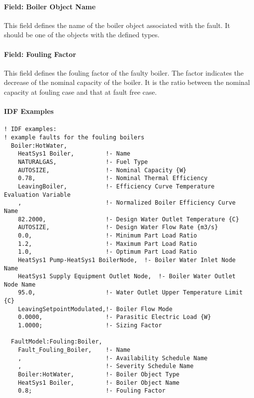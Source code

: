 \paragraph{Field: Boiler Object Name}\label{field-boiler-object-name}

This field defines the name of the boiler object associated with the fault. It should be one of the objects with the defined types.

\paragraph{Field: Fouling Factor}\label{field-fouling-factor}

This field defines the fouling factor of the faulty boiler. The factor indicates the decrease of the nominal capacity of the boiler. It is the ratio between the nominal capacity at fouling case and that at fault free case.

\paragraph{IDF Examples}

\begin{lstlisting}
! IDF examples:
! example faults for the fouling boilers
  Boiler:HotWater,
    HeatSys1 Boiler,         !- Name
    NATURALGAS,              !- Fuel Type
    AUTOSIZE,                !- Nominal Capacity {W}
    0.78,                    !- Nominal Thermal Efficiency
    LeavingBoiler,           !- Efficiency Curve Temperature Evaluation Variable
    ,                        !- Normalized Boiler Efficiency Curve Name
    82.2000,                 !- Design Water Outlet Temperature {C}
    AUTOSIZE,                !- Design Water Flow Rate {m3/s}
    0.0,                     !- Minimum Part Load Ratio
    1.2,                     !- Maximum Part Load Ratio
    1.0,                     !- Optimum Part Load Ratio
    HeatSys1 Pump-HeatSys1 BoilerNode,  !- Boiler Water Inlet Node Name
    HeatSys1 Supply Equipment Outlet Node,  !- Boiler Water Outlet Node Name
    95.0,                    !- Water Outlet Upper Temperature Limit {C}
    LeavingSetpointModulated,!- Boiler Flow Mode
    0.0000,                  !- Parasitic Electric Load {W}
    1.0000;                  !- Sizing Factor

  FaultModel:Fouling:Boiler,
    Fault_Fouling_Boiler,    !- Name
    ,                        !- Availability Schedule Name
    ,                        !- Severity Schedule Name
    Boiler:HotWater,         !- Boiler Object Type
    HeatSys1 Boiler,         !- Boiler Object Name
    0.8;                     !- Fouling Factor

\end{lstlisting}


